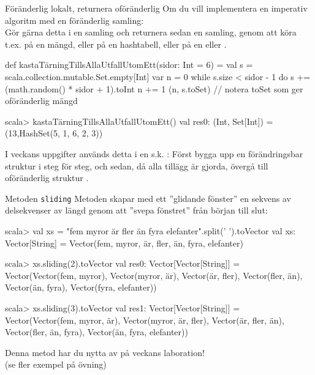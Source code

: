 \begin{Slide}{Föränderlig lokalt, returnera oföränderlig}
\SlideFontSmall
Om du vill implementera en imperativ algoritm med en föränderlig samling:\\
Gör gärna detta  i en  samling och returnera sedan en  samling, genom att köra t.ex.  på en mängd, eller  på en hashtabell, eller  på en  eller .
\begin{Code}
def kastaTärningTillsAllaUtfallUtomEtt(sidor: Int = 6) = 
  val s = scala.collection.mutable.Set.empty[Int]
  var n = 0
  while s.size < sidor - 1 do
    s += (math.random() * sidor + 1).toInt
    n += 1
  (n, s.toSet)   // notera toSet som ger oföränderlig mängd
\end{Code}
\begin{REPL}
scala> kastaTärningTillsAllaUtfallUtomEtt()
val res0: (Int, Set[Int]) = (13,HashSet(5, 1, 6, 2, 3))
\end{REPL}
I veckans uppgifter används detta i en s.k. : Först bygga upp en förändringsbar struktur i  steg för steg,  
och sedan, då alla tillägg är gjorda, övergå till oföränderlig struktur . 
\end{Slide}


\begin{Slide}{Metoden \texttt{sliding}}\SlideFontSmall
Metoden  skapar med ett ''glidande fönster'' en sekvens av
delsekvenser av längd  genom att ''svepa fönstret'' från början till slut:
\begin{REPL}
scala> val xs = "fem myror är fler än fyra elefanter".split(' ').toVector
val xs: Vector[String] = Vector(fem, myror, är, fler, än, fyra, elefanter)

scala> xs.sliding(2).toVector
val res0: Vector[Vector[String]] =
  Vector(Vector(fem, myror), Vector(myror, är), Vector(är, fler),
      Vector(fler, än), Vector(än, fyra), Vector(fyra, elefanter))

scala> xs.sliding(3).toVector
val res1: Vector[Vector[String]] =
  Vector(Vector(fem, myror, är), Vector(myror, är, fler),
    Vector(är, fler, än), Vector(fler, än, fyra),
      Vector(än, fyra, elefanter))
\end{REPL}
Denna metod har du nytta av på veckans laboration!
\\(se fler exempel på övning)
\end{Slide}
  
